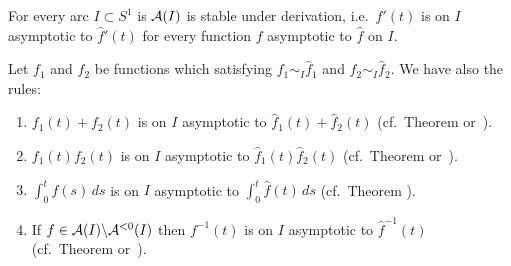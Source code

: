 \begin{comment}
  \begin{prop}
    \marginnote{\cite[4.5.Prop.9]{Balser2000Formal}}
    The following statements are equivalent:
    \begin{enumerate}
      \item $f\sim_{\mathfrak{s}}\hat f$;
      \item All derivations $f^{(n)}(t)$ are continuous at the origin, and for
        every proper sub-sector $\bar{\mathfrak{s}}'\Subset\mathfrak{s}$ there
        exist constants $c$, $K$ such that
        \[
          \frac{1}{n!}\sup_{t\in\bar{\mathfrak{s}}'}
          \left\Vert f^{(n)}(t) \right\Vert
          \leq cK^n
          \Gamma(1+n)
        \]
        for every $n\geq 0$.
    \end{enumerate}
  \end{prop}
\end{comment}
\begin{prop}\label{prop:optionsOfAsymptoticExp}
  For every arc $I\subset S^1$ is $\mathcal{A}(I)$ is stable under derivation, i.e.\
  $f'(t)$ is on $I$ asymptotic to $\hat f'(t)$ for every function $f$
  asymptotic to $\hat f$ on $I$.
  \begin{s-rem}
    Let $f_1$ and $f_2$ be functions which satisfying $f_1\sim_I\hat f_1$ and
    $f_2\sim_I\hat f_2$.
    We have also the rules:
    \begin{enumerate}
      \item $f_1(t)+f_2(t)$ is on $I$ asymptotic to $\hat f_1(t)+\hat f_2(t)$
        (cf.\ Theorem \cite[4.5.Thm.13]{Balser2000Formal}
        or~\cite[XI-1-6]{hsieh2012basic}).
      \item $f_1(t)f_2(t)$ is on $I$ asymptotic to $\hat f_1(t)\hat f_2(t)$
        (cf.\ Theorem \cite[4.5.Thm.14]{Balser2000Formal}
        or~\cite[XI-1-6]{hsieh2012basic}).
      \item $\int_0^tf(s)\,ds$ is on $I$ asymptotic to $\int_0^t\hat f(t)\,ds$
        (cf.\ Theorem \cite[4.5.Thm.20]{Balser2000Formal}).
      \item If $f\in\mathcal{A}(I)\backslash\mathcal{A}^{<0}(I)$ then $f^{-1}(t)$ is on $I$
        asymptotic to $\hat f^{-1}(t)$
        (cf.\ Theorem \cite[4.5.Thm.21]{Balser2000Formal}
        or~\cite[XI-1-9]{hsieh2012basic}).
    \end{enumerate}
  \end{s-rem}
\end{prop}
